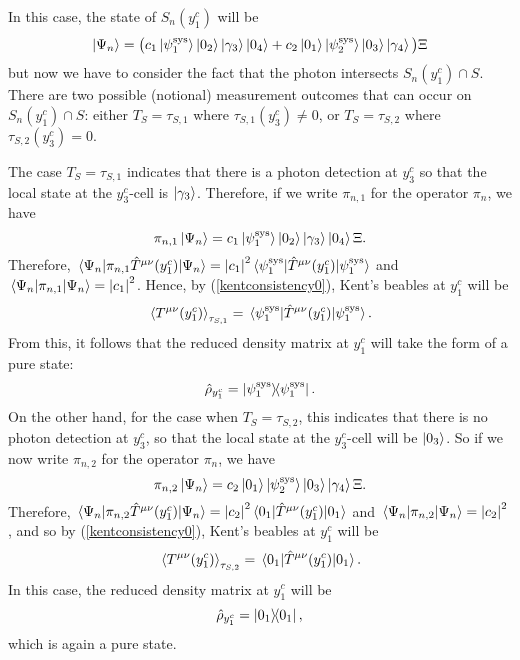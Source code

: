 In this case, the state of $S_n(y^c_1)$ will be
 \begin{equation*}
 \ket{\Psi_n}=\big(c_1\ket{\psi_1^\text{sys}}\ket{0_2}\ket{\gamma_3}\ket{0_4}+c_2\ket{0_1}\ket{\psi_2^\text{sys}}\ket{0_3}\ket{\gamma_4}\big)\Xi
 \end{equation*}
 but now we have to consider the fact that the photon intersects $S_n(y^c_1)\cap S$. There are two possible (notional) measurement outcomes that can occur on $S_n(y^c_1)\cap S$: either $T_S=\tau_{S,1}$ where $\tau_{S,1}(y^c_3)\neq 0$, or $T_S=\tau_{S,2}$ where $\tau_{S,2}(y^c_3)=0.$ 
 
 The case  $T_S=\tau_{S,1}$ indicates that there is a photon detection at $y^c_3$ so that the local state at the $y^c_3$-cell is $\ket{\gamma_3}$. Therefore, if we write $\pi_{n,1}$ for the operator $\pi_n$, we have 
 $$\pi_{n,1}\ket{\Psi_n}=c_1\ket{\psi_1^\text{sys}}\ket{0_2}\ket{\gamma_3}\ket{0_4}\Xi.$$
 Therefore, 
 $\ev*{\pi_{n,1}\hat{T}^{\mu\nu}(y^c_1)}{\Psi_n}=\abs{c_1}^2\ev*{\hat{T}^{\mu\nu}(y^c_1)}{\psi_1^\text{sys}}$ and  $\ev*{\pi_{n,1}}{\Psi_n}=\abs{c_1}^2$. Hence, by (\ref{kentconsistency0}), Kent's beables at $y^c_1$ will be 
 $$\ev*{T^{\mu\nu}(y^c_1)}_{\tau_{S,1}}=\ev*{\hat{T}^{\mu\nu}(y^c_1)}{\psi_1^\text{sys}}.$$ 
 From this, it follows that the reduced density matrix at $y^c_1$ will take the form of a pure state:
 \begin{equation}\label{purerho}
\hat{\rho}_{y^c_1}= \dyad{\psi_1^\text{sys}}.
\end{equation} 
 On the other hand, for the case when  $T_S=\tau_{S,2}$, this indicates that there is no photon detection at $y^c_3$, so that the local state at the $y^c_3$-cell will be $\ket{0_3}$. So if we now  write $\pi_{n,2}$ for the operator $\pi_n$, we have 
 $$\pi_{n,2}\ket{\Psi_n}=c_2\ket{0_1}\ket{\psi_2^\text{sys}}\ket{0_3}\ket{\gamma_4}\Xi.$$
 Therefore, 
 $\ev*{\pi_{n,2}\hat{T}^{\mu\nu}(y^c_1)}{\Psi_n}=\abs{c_2}^2\ev*{\hat{T}^{\mu\nu}(y^c_1)}{0_1}$ and  $\ev*{\pi_{n,2}}{\Psi_n}=\abs{c_2}^2$,  
  and so by (\ref{kentconsistency0}), Kent's beables at $y^c_1$ will be 
 $$\ev*{T^{\mu\nu}(y^c_1)}_{\tau_{S,2}}=\ev*{\hat{T}^{\mu\nu}(y^c_1)}{0_1}.$$
 In this case, the reduced density matrix at $y^c_1$  will be
  \begin{equation}
\hat{\rho}_{y^c_1}= \dyad{0_1},
\end{equation} 
which is again a pure state.

